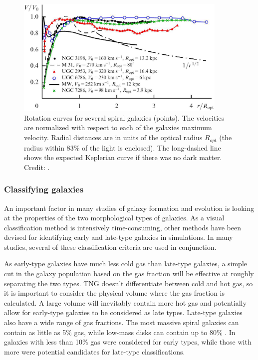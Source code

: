 \begin{figure}
    \centering
    \includegraphics[width=0.9\textwidth]{images/rotation_curves.png}
    \caption{Rotation curves for several spiral galaxies (points). The velocities are normalized with respect to each of the galaxies maximum velocity. Radial distances are in units of the optical radius $R_{opt}$ (the radius within 83\% of the light is enclosed). The long-dashed line shows the expected Keplerian curve if there was no dark matter. Credit: \textcite{Zasov2017}.}
    \label{rotation_curves}
\end{figure}

\subsubsection{Classifying galaxies}

An important factor in many studies of galaxy formation and evolution is looking at the properties of the two morphological types of galaxies. As a visual classification method is intensively time-consuming, other methods have been devised for identifying early and late-type galaxies in simulations. In many studies, several of these classification criteria are used in conjunction.

As early-type galaxies have much less cold gas than late-type galaxies, a simple cut in the galaxy population based on the gas fraction will be effective at roughly separating the two types. TNG doesn't differentiate between cold and hot gas, so it is important to consider the physical volume where the gas fraction is calculated. A large volume will inevitably contain more hot gas and potentially allow for early-type galaxies to be considered as late types. Late-type galaxies also have a wide range of gas fractions. The most massive spiral galaxies can contain as little as 5\% gas, while low-mass disks can contain up to 80\% \parencite{Mo2010}. In \textcite{Ferrero2020} galaxies with less than 10\% gas were considered for early types, while those with more were potential candidates for late-type classifications.

